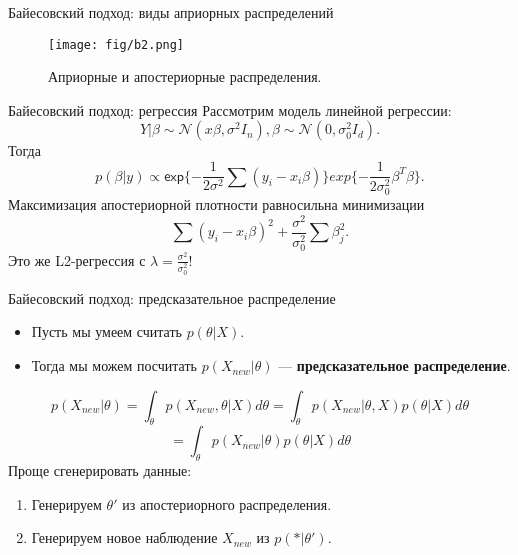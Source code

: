 \documentclass[handout]{beamer}
\begin{document}
\begin{frame}{Байесовский подход: виды априорных распределений}
	\begin{figure}
	    \texttt{[image: fig/b2.png]}
	    \caption{\small Априорные и апостериорные распределения.
	    } 
	    \label{fig:w_series}
	\end{figure}
\end{frame}

\begin{frame}{Байесовский подход: регрессия}
	Рассмотрим модель линейной регрессии:
	\begin{equation*}
		Y|\beta \sim \mathcal{N}(x\beta, \sigma^2I_n), \beta \sim \mathcal{N}(0, \sigma^2_0I_d).
	\end{equation*}
	Тогда 
	\begin{equation*}
		p(\beta|y) \propto \mathsf{exp}\{-\frac{1}{2\sigma^2}\sum(y_i-x_i\beta)\}exp\{-\frac{1}{2\sigma^2_0}\beta^T\beta\}.
	\end{equation*}
	Максимизация апостериорной плотности равносильна минимизации
	\begin{equation*}
		\sum(y_i-x_i\beta)^2+\frac{\sigma^2}{\sigma^2_0}\sum\beta^2_j.
	\end{equation*}
	Это же L2-регрессия с $\lambda=\frac{\sigma^2}{\sigma^2_0}$!
\end{frame}

\begin{frame}{Байесовский подход: предсказательное распределение}
	\begin{itemize}
		\item Пусть мы умеем считать $p(\theta | X)$.
		\item Тогда мы можем посчитать $p(X_{new}|\theta)$ --- \textbf{предсказательное распределение}.
	\end{itemize}
	\begin{equation*}
		p(X_{new}|\theta)=\int_{\theta}p(X_{new}, \theta|X)d\theta=\int_{\theta}p(X_{new}|\theta,X)p(\theta | X)d\theta
	\end{equation*}
	\begin{equation*}
		= \int_{\theta}p(X_{new}|\theta)p(\theta | X)d\theta
	\end{equation*}
	Проще сгенерировать данные:
	\begin{enumerate}
		\item Генерируем $\theta'$ из апостериорного распределения.
		\item Генерируем новое наблюдение $X_{new}$ из $p(*|\theta')$.
	\end{enumerate}
\end{frame}
\end{document}
